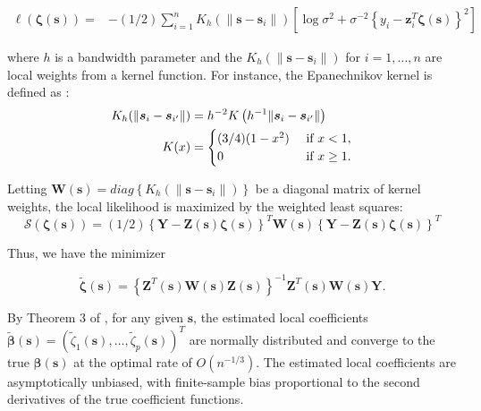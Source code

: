 \documentclass[authoryear,review, 12pt]{elsarticle}
\begin{document}
\begin{align}
\ell\left(\bm{\zeta}(\bm{s})\right)= & -(1/2)\sum_{i=1}^{n}K_{h}(\|\bm{s}-\bm{s}_{i}\|)\left[\log\sigma^{2}+\sigma^{-2}\left\{ y_{i}-\bm{z}_{i}^{T}\bm{\zeta}\left(\bm{s}\right)\right\} ^{2}\right]\label{eq:local-log-likelihood}
\end{align}


where $h$ is a bandwidth parameter and the $K_{h}\left(\|\bm{s}-\bm{s}_{i}\|\right)$
for $i=1,\dots,n$ are local weights from a kernel function. For instance,
the Epanechnikov kernel is defined as \citep{Samiuddin-el-Sayyad-1990}:
\begin{align}
K_{h}(\|\bm{s}_{i}-\bm{s}_{i'}\|) & =h^{-2}K\left(h^{-1}\|\bm{s}_{i}-\bm{s}_{i'}\|\right)\notag\label{eq:epanechnikov}\\
K(x) & =\begin{cases}
(3/4)(1-x^{2}) & \mbox{ if }x<1,\\
0 & \mbox{ if }x\geq1.
\end{cases}
\end{align}


Letting $\bm{W}(\bm{s})=diag\left\{ K_{h}(\|\bm{s}-\bm{s}_{i}\|)\right\} $
be a diagonal matrix of kernel weights, the local likelihood is maximized
by the weighted least squares: 
\begin{equation}
\mathcal{S}\left(\bm{\zeta}\left(\bm{s}\right)\right)=(1/2)\left\{ \bm{Y}-\bm{Z}(\bm{s})\bm{\zeta}(\bm{s})\right\} ^{T}\bm{W}(\bm{s})\left\{ \bm{Y}-\bm{Z}(\bm{s})\bm{\zeta}(\bm{s})\right\} ^{T}\label{eq:local-sum-of-squares}
\end{equation}


Thus, we have the minimizer

\begin{equation}
\tilde{\bm{\zeta}}(\bm{s})=\left\{ \bm{Z}^{T}(\bm{s})\bm{W}(\bm{s})\bm{Z}(\bm{s})\right\} ^{-1}\bm{Z}^{T}(\bm{s})\bm{W}(\bm{s})\bm{Y}.\label{eq:zeta-hat}
\end{equation}


By Theorem 3 of \citet{Sun-Yan-Zhang-Lu-2014}, for any given $\bm{s}$,
the estimated local coefficients $\tilde{\bm{\beta}}\left(\bm{s}\right)=\left(\tilde{\zeta}_{1}\left(\bm{s}\right),\dots,\tilde{\zeta}_{p}\left(\bm{s}\right)\right)^{T}$
are normally distributed and converge to the true $\bm{\beta}\left(\bm{s}\right)$
at the optimal rate of $O\left(n^{-1/3}\right)$. The estimated local
coefficients are asymptotically unbiased, with finite-sample bias
proportional to the second derivatives of the true coefficient functions.
\end{document}
